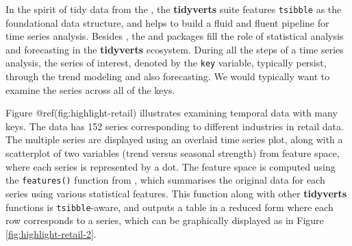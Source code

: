In the spirit of tidy data from the 
\citep{Wickham2019}, the \textbf{tidyverts} suite features
\texttt{tsibble} as the foundational data structure, and helps to build
a fluid and fluent pipeline for time series analysis. Besides
, the  \citep{R-feasts} and
 \citep{R-fable} packages fill the role of statistical
analysis and forecasting in the \textbf{tidyverts} ecosystem. During all
the steps of a time series analysis, the series of interest, denoted by
the \texttt{key} variable, typically persist, through the trend modeling
and also forecasting. We would typically want to examine the series
across all of the keys.

Figure @ref(fig:highlight-retail) illustrates examining temporal data
with many keys. The data has 152 series corresponding to different
industries in retail data. The multiple series are displayed using an
overlaid time series plot, along with a scatterplot of two variables
(trend versus seasonal strength) from feature space, where each series
is represented by a dot. The feature space is computed using the
\texttt{features()} function from , which summarises the
original data for each series using various statistical features. This
function along with other \textbf{tidyverts} functions is
\texttt{tsibble}-aware, and outputs a table in a reduced form where each
row corresponds to a series, which can be graphically displayed as in
Figure \ref{fig:highlight-retail-2}.

